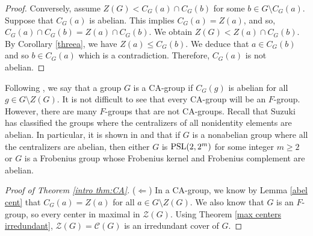 \documentclass[12pt]{amsart}
\newtheorem{theorem}{Theorem}[section]
\begin{document}
{\begin{proof}
Conversely, assume $Z(G) < C_G(a) \cap C_G(b)$ for some $b \in G \setminus C_G (a)$.  Suppose that $C_G (a)$ is abelian.  This implies $C_G (a) = Z(a)$, and so, $C_G (a) \cap C_G (b) = Z(a) \cap C_G (b)$.  We obtain $Z(G) < Z(a) \cap C_G (b)$.  By Corollary \ref{threea}, we have $Z(a) \le C_G(b)$.  We deduce that $a \in C_G(b)$ and so $b \in C_G (a)$ which is a contradiction.  Therefore, $C_G(a)$ is not abelian.
\end{proof}




Following \cite{DHJ}, we say that a group $G$ is a CA-group if $C_G (g)$ is abelian for all $g \in G \setminus Z(G)$.  It is not difficult to see that every CA-group will be an $F$-group.  However, there are many $F$-groups that are not CA-groups.  Recall that Suzuki has classified the groups where the centralizers of all nonidentity elements are abelian.  In particular, it is shown in \cite{bsw} and \cite{suz} that if $G$ is a nonabelian group where all the centralizers are abelian, then either $G$ is ${\rm PSL} (2,2^m)$ for some integer $m \ge 2$ or $G$ is a Frobenius group whose Frobenius kernel and Frobenius complement are abelian.



\begin{proof} [Proof of Theorem \ref{intro thm:CA}]
($\Leftarrow$) In a CA-group, we know by Lemma \ref{abel cent} that $C_G (a) = Z(a)$ for all $a \in G \setminus Z(G)$.  We also know that $G$ is an $F$-group, so every center in maximal in $\mathcal{Z} (G)$.  Using Theorem \ref{max centers irredundant}, $\mathcal {Z} (G) = \mathcal {C} (G)$ is an irredundant cover of $G$.  %
	

\end{proof}}
\end{document}
